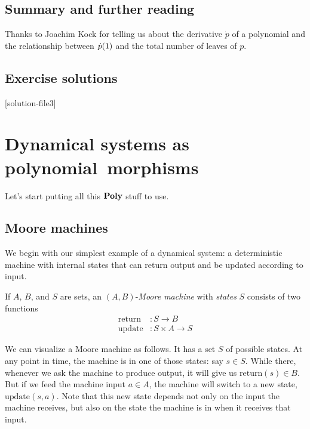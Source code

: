 \documentclass[Book-Poly]{subfiles}
\begin{document}
\section{Summary and further reading}

Thanks to Joachim Kock for telling us about the derivative $\dot{p}$ of a polynomial and the relationship between $\dot{p}(\textsf{1})$ and the total number of leaves of $p$.

\section{Exercise solutions}
{\footnotesize
}

[solution-file3]

\chapter{Dynamical systems as polynomial~morphisms} \label{ch.poly.dyn_sys}

Let's start putting all this $\mathbf{Poly}$ stuff to use. 

\section{Moore machines}

We begin with our simplest example of a dynamical system: a deterministic machine with internal states that can return output and be updated according to input.

\begin{definition}\label{def.moore_machine}
If $A$, $B$, and $S$ are sets, an $(A,B)$-\emph{Moore machine} with \emph{states} $S$ consists of two functions
\begin{align*}
	\text{return}&\colon S\to B\\
	\text{update}&\colon S\times A\to S 
\end{align*}
\end{definition}

We can visualize a Moore machine as follows.
It has a set $S$ of possible states.
At any point in time, the machine is in one of those states: say $s \in S$.
While there, whenever we ask the machine to produce output, it will give us $\text{return}(s) \in B$.
But if we feed the machine input $a \in A$, the machine will switch to a new state, $\text{update}(s, a)$.
Note that this new state depends not only on the input the machine receives, but also on the state the machine is in when it receives that input.
\end{document}
